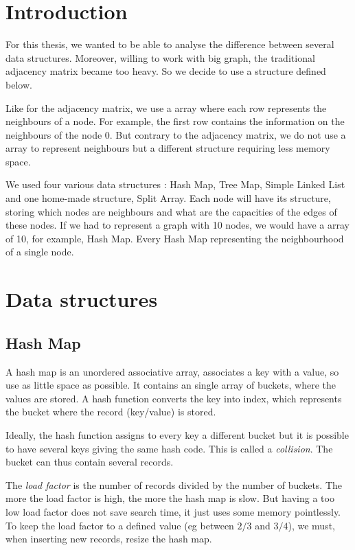 \section{Introduction}
For this thesis, we wanted to be able to analyse the difference between several data structures. Moreover, willing to work with big graph, the traditional adjacency matrix became too heavy. So we decide to use a structure defined below. \newline

Like for the adjacency matrix, we use a array where each row represents the neighbours of a node. For example, the first row contains the information on the neighbours of the node 0. But contrary to the adjacency matrix, we do not use a array to represent neighbours but a different structure requiring less memory space. \newline

We used four various data structures : Hash Map, Tree Map, Simple Linked List and one home-made structure, Split Array. Each node will have its structure, storing which nodes are neighbours and what are the capacities of the edges of these nodes. If we had to represent a graph with 10 nodes, we would have a array of 10, for example, Hash Map. Every Hash Map representing the neighbourhood of a single node.

\section{Data structures}
\subsection{Hash Map}
A hash map is an unordered associative array, associates a key with a value, so use as little space as possible. It contains an single array of buckets, where the values are stored. A hash function converts the key into index, which represents the bucket where the record (key/value) is stored. \newline

Ideally, the hash function assigns to every key a different bucket but it is possible to have several keys giving the same hash code. This is called a \textit{collision}. The bucket can thus contain several records. \newline

The \textit{load factor} is the number of records divided by the number of buckets.  The more the load factor is high, the more the hash map is slow. But having a too low load factor does not save search time, it just uses some memory pointlessly. To keep the load factor to a defined value (eg between $2/3$ and $3/4$), we must, when inserting new records, resize the hash map. \newline

